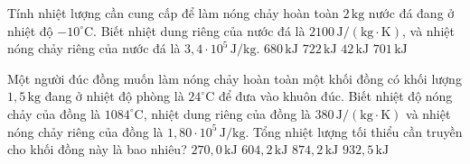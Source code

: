 \begin{ex}
Tính nhiệt lượng cần cung cấp để làm nóng chảy hoàn toàn $2\,\mathrm{kg}$ nước đá đang ở nhiệt độ $-10^{\circ}\mathrm{C}$. Biết nhiệt dung riêng của nước đá là $2100\,\mathrm{J/(kg\cdot K)}$, và nhiệt nóng chảy riêng của nước đá là $3,4\cdot 10^5\,\mathrm{J/kg}$.
\choice
{$680\,\mathrm{kJ}$}
{\True $722\,\mathrm{kJ}$}
{$42\,\mathrm{kJ}$}
{$701\,\mathrm{kJ}$}
\end{ex}

\begin{ex}
Một người đúc đồng muốn làm nóng chảy hoàn toàn một khối đồng có khối lượng $1,5\,\mathrm{kg}$ đang ở nhiệt độ phòng là $24^{\circ}\mathrm{C}$ để đưa vào khuôn đúc. Biết nhiệt độ nóng chảy của đồng là $1084^{\circ}\mathrm{C}$, nhiệt dung riêng của đồng là $380\,\mathrm{J/(kg\cdot K)}$ và nhiệt nóng chảy riêng của đồng là $1,80\cdot 10^5\,\mathrm{J/kg}$. Tổng nhiệt lượng tối thiểu cần truyền cho khối đồng này là bao nhiêu?
\choice
{$270,0\,\mathrm{kJ}$}
{$604,2\,\mathrm{kJ}$}
{\True $874,2\,\mathrm{kJ}$}
{$932,5\,\mathrm{kJ}$}
\end{ex}

